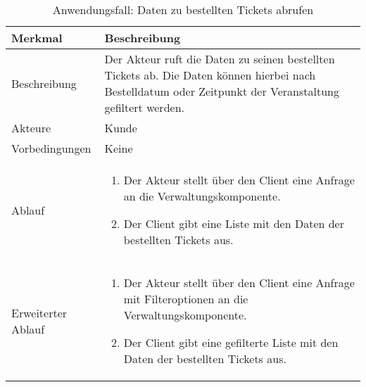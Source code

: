 \begin{table}[H]
    \centering
    \caption{Anwendungsfall: Daten zu bestellten Tickets abrufen}
    \label{tab:use_case_list_customer_tickets}
    \begin{tabularx}{\textwidth}{lX}
        \toprule
        \textbf{Merkmal} & \textbf{Beschreibung}  \\ \midrule
        Beschreibung    & Der Akteur ruft die Daten zu seinen bestellten Tickets ab. Die Daten können hierbei nach Bestelldatum oder Zeitpunkt der Veranstaltung gefiltert werden. \\
        Akteure         & Kunde \\
        Vorbedingungen  & Keine \\
        Ablauf          & \begin{minipage}[t]{\linewidth}
        \vspace*{-3mm}
        \begin{enumerate}[leftmargin=*,nosep,after=\strut]
            \item Der Akteur stellt über den Client eine Anfrage an die Verwaltungskomponente.
            \item Der Client gibt eine Liste mit den Daten der bestellten Tickets aus.
        \end{enumerate}
        \end{minipage} \\
        Erweiterter Ablauf & \begin{minipage}[t]{\linewidth}
            \vspace*{-3mm}
            \begin{enumerate}[leftmargin=*,nosep,after=\strut]
                \item Der Akteur stellt über den Client eine Anfrage mit Filteroptionen an die Verwaltungskomponente.
                \item Der Client gibt eine gefilterte Liste mit den Daten der bestellten Tickets aus.
            \end{enumerate}
            \end{minipage} \\\bottomrule
    \end{tabularx}    
\setlength\belowcaptionskip{4pt}
\end{table}

